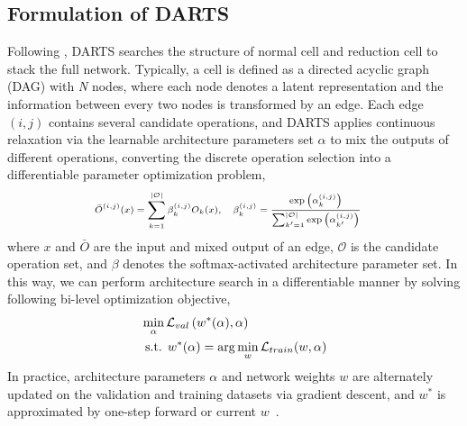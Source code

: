 \documentclass[10pt,twocolumn,letterpaper]{article}
\begin{document}
\subsection{Formulation of DARTS}
Following \cite{zoph2018learning}, DARTS searches the structure of normal cell and reduction cell to stack the full network. Typically, a cell is defined as a directed acyclic graph (DAG) with \textit{N} nodes, where each node denotes a latent representation and the information between every two nodes is transformed by an edge. Each edge $(i, j)$ contains several candidate operations, and DARTS applies continuous relaxation via the learnable architecture parameters set $\alpha$ to mix the outputs of different operations, converting the discrete operation selection into a differentiable parameter optimization problem,
\begin{equation}\label{eqn1} 
\scriptsize
  \begin{split}
    &\bar{O}^{(i, j)}(x)=\sum_{k=1}^{\left | \mathcal{O}\right |} \beta_{k}^{(i, j)} O_k(x),\quad \beta_{k}^{(i, j)}=\frac{\exp \left(\alpha_{k}^{(i, j)}\right)}{\sum_{k^{\prime}=1}^{\left | \mathcal{O}\right |} \exp \left(\alpha_{k^{\prime}}^{(i, j)}\right)}
  \end{split}
  \vspace{-6pt}
\end{equation} 
where $x$ and $\bar{O}$ are the input and mixed output of an edge, $\mathcal{O}$ is the candidate operation set, and $\beta$ denotes the softmax-activated architecture parameter set. In this way, we can perform architecture search in a differentiable manner by solving following bi-level optimization objective,
\begin{equation} \label{eqn2}
  \begin{split}
    &\min_{\alpha}\mathcal{L}_{val}\left(w^{*}(\alpha), \alpha\right) \\
    &\text { s.t. } w^{*}(\alpha)=\arg \min _{w} \mathcal{L}_{train}(w, \alpha)
  \end{split}
  \vspace{-6pt}
\end{equation}
In practice, architecture parameters $\alpha$ and network weights $w$ are alternately updated on the validation and training datasets via gradient descent, and $w^{*}$ is approximated by one-step forward or current $w$~\cite{darts}.
\end{document}

